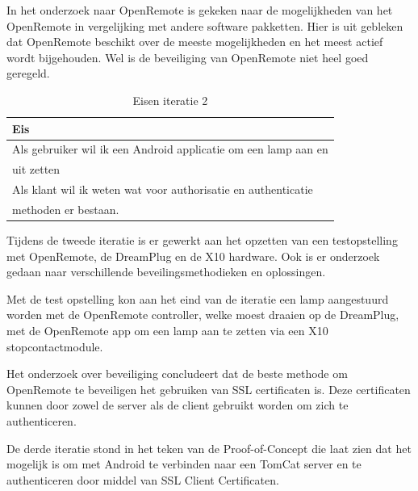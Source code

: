 \documentclass[]{article}
\begin{document}
In het onderzoek naar OpenRemote is gekeken naar de mogelijkheden van het
OpenRemote in vergelijking met andere software pakketten. Hier is uit
gebleken dat OpenRemote beschikt over de meeste mogelijkheden en het meest
actief wordt bijgehouden. Wel is de beveiliging van OpenRemote niet heel
goed geregeld.

\begin{table}[htpb]
  \caption{Eisen iteratie 2}
  \begin{center}
    \begin{tabular}{|| l ||}\hline
        Eis                                                              \\\hline\hline
        Als gebruiker wil ik een Android applicatie om een lamp aan en   \\ 
        uit zetten                                                       \\\hline
        Als klant wil ik weten wat voor authorisatie en authenticatie    \\
        methoden er bestaan.                                             \\\hline
    \end{tabular}
  \end{center}
\end{table}

Tijdens de tweede iteratie is er gewerkt aan het opzetten van een
testopstelling met OpenRemote, de DreamPlug en de X10 hardware. Ook is er
onderzoek gedaan naar verschillende beveilingsmethodieken en oplossingen.

Met de test opstelling kon aan het eind van de iteratie een lamp
aangestuurd worden met de OpenRemote controller, welke moest draaien op de
DreamPlug, met de OpenRemote app om een lamp aan te zetten via een X10
stopcontactmodule.

Het onderzoek over beveiliging concludeert dat de beste methode om
OpenRemote te beveiligen het gebruiken van SSL certificaten is. Deze
certificaten kunnen door zowel de server als de client gebruikt worden om
zich te authenticeren.

De derde iteratie stond in het teken van de Proof-of-Concept die laat zien
dat het mogelijk is om met Android te verbinden naar een TomCat server en
te authenticeren door middel van SSL Client Certificaten.
\end{document}
